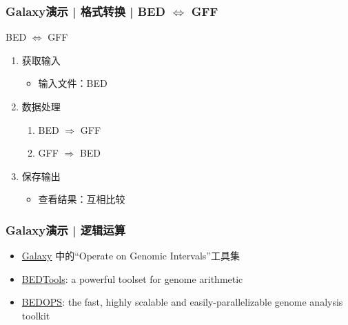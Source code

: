 \begin{frame}
  \frametitle{Galaxy演示 | 格式转换 | BED $\Leftrightarrow$ GFF}
  \begin{block}{BED $\Leftrightarrow$ GFF}
    \pause
  \begin{enumerate}[<+-|alert@+>]
    \item 获取输入
      \begin{itemize}
        \item 输入文件：BED
      \end{itemize}
    \item 数据处理
      \begin{enumerate}
        \item BED $\Rightarrow$ GFF
        \item GFF $\Rightarrow$ BED
      \end{enumerate}
    \item 保存输出
      \begin{itemize}
        \item 查看结果：互相比较
      \end{itemize}
  \end{enumerate}
\end{block}
\end{frame}

\begin{frame}
  \frametitle{Galaxy演示 | \alert{逻辑运算}}
  \begin{itemize}
    \item \href{https://usegalaxy.org/}{Galaxy} 中的“Operate on Genomic Intervals”工具集
    \item \href{http://bedtools.readthedocs.org/en/latest/}{BEDTools}: a powerful toolset for genome arithmetic
    \item \href{https://bedops.readthedocs.org/en/latest/}{BEDOPS}: the fast, highly scalable and easily-parallelizable genome analysis toolkit
  \end{itemize}
\end{frame}

